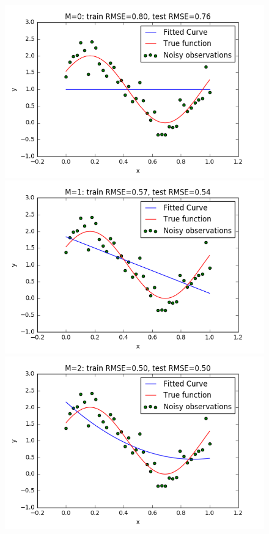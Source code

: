 \documentclass[a4paper]{article}
\begin{document}
\begin{figure}[h!]
\begin{multicols}{2}
    \includegraphics[width=\linewidth]{Images/curvefit_m0_n_40.png}\par 
    \includegraphics[width=\linewidth]{Images/curvefit_m1_n_40.png}\par 
    \end{multicols}
\begin{multicols}{2}
    \includegraphics[width=\linewidth]{Images/curvefit_m2_n_40.png}\par

\end{multicols}
\end{figure}
\end{document}
